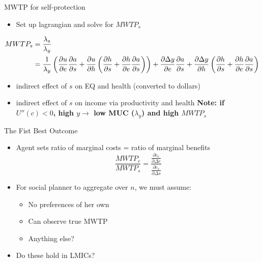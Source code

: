 \documentclass[
  ignorenonframetext,
  aspectratio=169]{beamer}
\providecommand{\tightlist}{%
  \setlength{\itemsep}{0pt}\setlength{\parskip}{0pt}}
\begin{document}
\begin{frame}{MWTP for self-protection}
\protect\hypertarget{mwtp-for-self-protection}{}
\begin{itemize}
\tightlist
\item
  Set up lagrangian and solve for \(MWTP_{s}\)
\end{itemize}

\begin{align}
MWTP_{s} & = \frac{\lambda_{s}}{\lambda_{y}} \notag \\ & = \frac{1}{\lambda_{y}} \left(\frac{\partial u}{\partial e}\frac{\partial a}{\partial s} + \frac{\partial u}{\partial h} \left(\frac{\partial h}{\partial s} + \frac{\partial h}{\partial e}\frac{\partial a}{\partial s} \right)\right) + \frac{\partial \Delta y}{\partial e}\frac{\partial a}{\partial s} + \frac{\partial \Delta y}{\partial h}\left(\frac{\partial h}{\partial s} + \frac{\partial h}{\partial e}\frac{\partial a}{\partial s}\right) \notag
\end{align}

\begin{itemize}
\tightlist
\item
  indirect effect of \(s\) on EQ and health (converted to dollars)
\item
  indirect effect of \(s\) on income via productivity and health \vfill
  \textbf{Note: if \(U''(c)<0\), high \(y \rightarrow\) low MUC
  (\(\lambda_{y}\)) and high \(MWTP_{s}\)}
\end{itemize}
\end{frame}

\begin{frame}{The Fist Best Outcome}
\protect\hypertarget{the-fist-best-outcome}{}
\begin{itemize}
\tightlist
\item
  Agent sets ratio of marginal costs = ratio of marginal benefits
  \[\frac{MWTP_{e}}{MWTP_{s}}=\frac{\frac{\partial c_{e}}{\partial \Delta e}}{\frac{\partial c_{s}}{\partial \Delta s}}\]
\end{itemize}

\vfill

\begin{itemize}
\tightlist
\item
  For social planner to aggregate over \(n\), we must assume:

  \begin{itemize}
  \tightlist
  \item
    No preferences of her own
  \item
    Can observe true MWTP
  \item
    Anything else? \vfill
  \end{itemize}
\item
  Do these hold in LMICs?
\end{itemize}
\end{frame}
\end{document}
